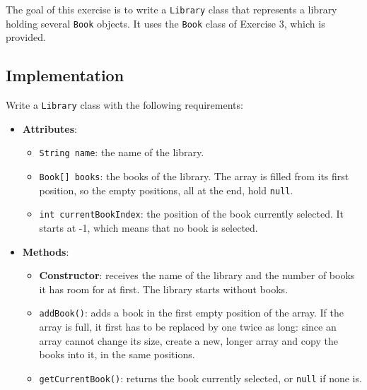 The goal of this exercise is to write a \texttt{Library} class that represents a library holding several \texttt{Book} objects. It uses the \texttt{Book} class of Exercise 3, which is provided.

\subsection{Implementation}

Write a \texttt{Library} class with the following requirements:

\begin{itemize}

    \item \textbf{Attributes}:

        \begin{itemize}

            \item \texttt{String name}: the name of the library.

            \item \texttt{Book[] books}: the books of the library. The array is filled from its first position, so the empty positions, all at the end, hold \texttt{null}.

            \item \texttt{int currentBookIndex}: the position of the book currently selected. It starts at -1, which means that no book is selected.

        \end{itemize}

    \item \textbf{Methods}:

        \begin{itemize}

            \item \textbf{Constructor}: receives the name of the library and the number of books it has room for at first. The library starts without books.

            \item \texttt{addBook()}: adds a book in the first empty position of the array. If the array is full, it first has to be replaced by one twice as long: since an array cannot change its size, create a new, longer array and copy the books into it, in the same positions.

            \item \texttt{getCurrentBook()}: returns the book currently selected, or \texttt{null} if none is.


\end{itemize}
\end{itemize}
